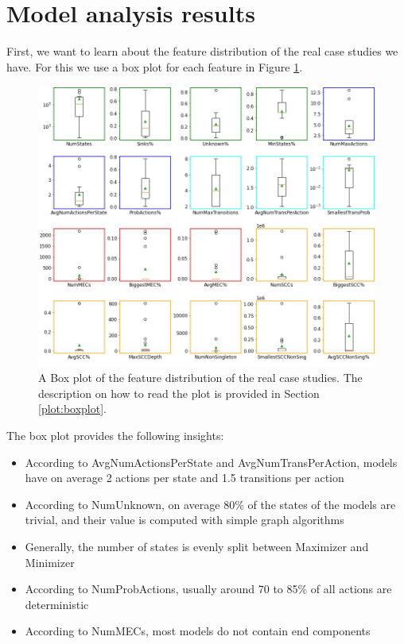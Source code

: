 \section{Model analysis results}
First, we want to learn about the feature distribution of the real case studies we have. 
For this we use a box plot for each feature in Figure \ref{fig:Real_FeatureDistribution}.
\begin{figure}[h!]
    \centering
    \includegraphics[width=1\textwidth]{figures/Real_FeatureDistribution.jpg}
    \caption[Feature Distribution of the case studies]{
        A Box plot of the feature distribution of the real case studies. The description on how to read the plot is provided in Section \ref{plot:boxplot}.
    }
    \label{fig:Real_FeatureDistribution}
\end{figure}
The box plot provides the following insights:
\begin{itemize} \label{insights:realDistribution}
    \item According to AvgNumActionsPerState and AvgNumTransPerAction, models have on average 2 actions per state and 1.5 transitions per action
    \item According to NumUnknown, on average 80\% of the states of the models are trivial, and their value is computed with simple graph algorithms 
    \item Generally, the number of states is evenly split between Maximizer and Minimizer
    \item According to NumProbActions, usually around 70 to 85\% of all actions are deterministic
    \item According to NumMECs, most models do not contain end components
\end{itemize}

